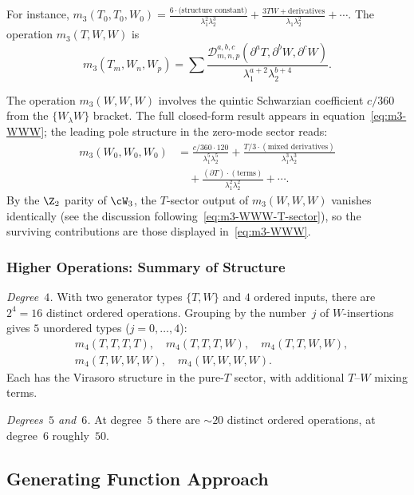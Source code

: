 For instance,
$m_3(T_0, T_0, W_0) = \frac{6 \cdot \text{(structure constant)}}{\lambda_1^2 \lambda_2^3} + \frac{3TW + \text{derivatives}}{\lambda_1 \lambda_2^2} + \cdots$.
The operation $m_3(T,W,W)$ is
\begin{equation}
m_3(T_m, W_n, W_p) = \sum \frac{\mathcal{D}_{m,n,p}^{a,b,c}(\partial^a T, \partial^b W, \partial^c W)}{\lambda_1^{a+2} \lambda_2^{b+4}}.
\end{equation}

The operation $m_3(W,W,W)$ involves the quintic Schwarzian coefficient
$c/360$ from the $\{W_\lambda W\}$ bracket. The full
closed-form result appears in
equation~\eqref{eq:m3-WWW}; the leading pole structure in the zero-mode
sector reads:
\begin{align}
m_3(W_0, W_0, W_0) &= \frac{c/360 \cdot 120}{\lambda_1^5 \lambda_2^5} + \frac{T/3 \cdot (\text{mixed derivatives})}{\lambda_1^3 \lambda_2^3}\\
&\quad + \frac{(\partial T) \cdot (\text{terms})}{\lambda_1^2 \lambda_2^2} + \cdots.
\end{align}
By the $\Z_2$ parity of $\cW_3$, the $T$-sector output of
$m_3(W,W,W)$ vanishes identically (see the discussion
following~\eqref{eq:m3-WWW-T-sector}), so the surviving
contributions are those displayed
in~\eqref{eq:m3-WWW}.

\subsubsection{Higher Operations: Summary of Structure}

\emph{Degree~$4$.}
With two generator types $\{T, W\}$ and $4$ ordered inputs,
there are $2^4 = 16$ distinct ordered operations.
Grouping by the number~$j$ of $W$-insertions gives $5$ unordered types
($j = 0,\ldots,4$):
\begin{align}
&m_4(T,T,T,T), \quad m_4(T,T,T,W), \quad m_4(T,T,W,W),\\
&m_4(T,W,W,W), \quad m_4(W,W,W,W).
\end{align}
Each has the Virasoro structure in the pure-$T$ sector, with additional
$T$--$W$ mixing terms.

\emph{Degrees~$5$ and~$6$.}
At degree~$5$ there are $\sim 20$ distinct ordered operations,
at degree~$6$ roughly~$50$.

\subsection{Generating Function Approach}

